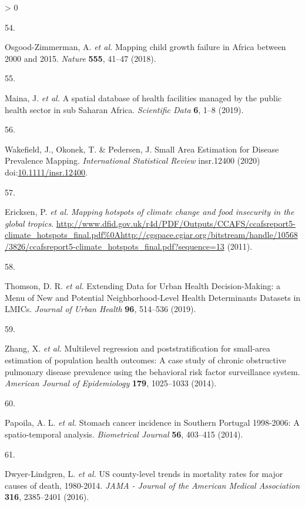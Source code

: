 \documentclass[
]{article}
\newlength{\cslhangindent}
\newlength{\csllabelwidth}
\newenvironment{CSLReferences}[2] %
 {%
  \setlength{\parindent}{0pt}
  \ifodd #1 \everypar{\setlength{\hangindent}{\cslhangindent}}\ignorespaces\fi
  \ifnum #2 > 0
  \setlength{\parskip}{#2\baselineskip}
  \fi
 }%
 {}
\newcommand{\CSLLeftMargin}[1]{\parbox[t]{\csllabelwidth}{#1}}
\newcommand{\CSLRightInline}[1]{\parbox[t]{\linewidth - \csllabelwidth}{#1}\break}
\begin{document}
\begin{CSLReferences}{0}{0}
\leavevmode\hypertarget{ref-Osgood-Zimmerman2018}{}%
\CSLLeftMargin{54. }
\CSLRightInline{Osgood-Zimmerman, A. \emph{et al.} {Mapping child growth failure in Africa between 2000 and 2015}. \emph{Nature} \textbf{555}, 41--47 (2018).}

\leavevmode\hypertarget{ref-Maina2019}{}%
\CSLLeftMargin{55. }
\CSLRightInline{Maina, J. \emph{et al.} {A spatial database of health facilities managed by the public health sector in sub Saharan Africa}. \emph{Scientific Data} \textbf{6}, 1--8 (2019).}

\leavevmode\hypertarget{ref-Wakefield2020}{}%
\CSLLeftMargin{56. }
\CSLRightInline{Wakefield, J., Okonek, T. \& Pedersen, J. {Small Area Estimation for Disease Prevalence Mapping}. \emph{International Statistical Review} insr.12400 (2020) doi:\href{https://doi.org/10.1111/insr.12400}{10.1111/insr.12400}.}

\leavevmode\hypertarget{ref-Ericksen2011}{}%
\CSLLeftMargin{57. }
\CSLRightInline{Ericksen, P. \emph{et al.} \emph{{Mapping hotspots of climate change and food insecurity in the global tropics}}. \url{http://www.dfid.gov.uk/r4d/PDF/Outputs/CCAFS/ccafsreport5-climate_hotspots_final.pdf\%0Ahttp://cgspace.cgiar.org/bitstream/handle/10568/3826/ccafsreport5-climate_hotspots_final.pdf?sequence=13} (2011).}

\leavevmode\hypertarget{ref-Thomson2019}{}%
\CSLLeftMargin{58. }
\CSLRightInline{Thomson, D. R. \emph{et al.} {Extending Data for Urban Health Decision-Making: a Menu of New and Potential Neighborhood-Level Health Determinants Datasets in LMICs}. \emph{Journal of Urban Health} \textbf{96}, 514--536 (2019).}

\leavevmode\hypertarget{ref-Zhang2014}{}%
\CSLLeftMargin{59. }
\CSLRightInline{Zhang, X. \emph{et al.} {Multilevel regression and poststratification for small-area estimation of population health outcomes: A case study of chronic obstructive pulmonary disease prevalence using the behavioral risk factor surveillance system}. \emph{American Journal of Epidemiology} \textbf{179}, 1025--1033 (2014).}

\leavevmode\hypertarget{ref-Papoila2014}{}%
\CSLLeftMargin{60. }
\CSLRightInline{Papoila, A. L. \emph{et al.} {Stomach cancer incidence in Southern Portugal 1998-2006: A spatio-temporal analysis}. \emph{Biometrical Journal} \textbf{56}, 403--415 (2014).}

\leavevmode\hypertarget{ref-Dwyer-Lindgren2016}{}%
\CSLLeftMargin{61. }
\CSLRightInline{Dwyer-Lindgren, L. \emph{et al.} {US county-level trends in mortality rates for major causes of death, 1980-2014}. \emph{JAMA - Journal of the American Medical Association} \textbf{316}, 2385--2401 (2016).}


\end{CSLReferences}
\end{document}
